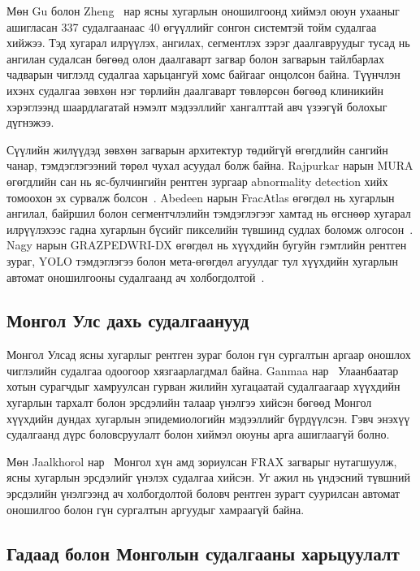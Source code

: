 Мөн Gu болон Zheng~\cite{ref13} нар ясны хугарлын оношилгоонд хиймэл оюун ухааныг ашигласан 337 судалгаанаас 40 өгүүллийг сонгон системтэй тойм судалгаа хийжээ. Тэд хугарал илрүүлэх, ангилах, сегментлэх зэрэг даалгавруудыг тусад нь ангилан судалсан бөгөөд олон даалгаварт загвар болон загварын тайлбарлах чадварын чиглэлд судалгаа харьцангуй хомс байгааг онцолсон байна. Түүнчлэн ихэнх судалгаа зөвхөн нэг төрлийн даалгаварт төвлөрсөн бөгөөд клиникийн хэрэглээнд шаардлагатай нэмэлт мэдээллийг хангалттай авч үзээгүй болохыг дүгнэжээ.

Сүүлийн жилүүдэд зөвхөн загварын архитектур төдийгүй өгөгдлийн сангийн чанар, тэмдэглэгээний төрөл чухал асуудал болж байна. Rajpurkar нарын MURA өгөгдлийн сан нь яс-булчингийн рентген зургаар abnormality detection хийх томоохон эх сурвалж болсон~\cite{ref39}. Abedeen нарын FracAtlas өгөгдөл нь хугарлын ангилал, байршил болон сегментчлэлийн тэмдэглэгээг хамтад нь өгснөөр хугарал илрүүлэхээс гадна хугарлын бүсийг пикселийн түвшинд судлах боломж олгосон~\cite{ref40}. Nagy нарын GRAZPEDWRI-DX өгөгдөл нь хүүхдийн бугуйн гэмтлийн рентген зураг, YOLO тэмдэглэгээ болон мета-өгөгдөл агуулдаг тул хүүхдийн хугарлын автомат оношилгооны судалгаанд ач холбогдолтой~\cite{ref41}.

\subsection*{Монгол Улс дахь судалгаанууд}

Монгол Улсад ясны хугарлыг рентген зураг болон гүн сургалтын аргаар оношлох чиглэлийн судалгаа одоогоор хязгаарлагдмал байна. Ganmaa нар~\cite{ref20} Улаанбаатар хотын сурагчдыг хамруулсан гурван жилийн хугацаатай судалгаагаар хүүхдийн хугарлын тархалт болон эрсдэлийн талаар үнэлгээ хийсэн бөгөөд Монгол хүүхдийн дундах хугарлын эпидемиологийн мэдээллийг бүрдүүлсэн. Гэвч энэхүү судалгаанд дүрс боловсруулалт болон хиймэл оюуны арга ашиглаагүй болно.

Мөн Jaalkhorol нар~\cite{ref21} Монгол хүн амд зориулсан FRAX загварыг нутагшуулж, ясны хугарлын эрсдэлийг үнэлэх судалгаа хийсэн. Уг ажил нь үндэсний түвшний эрсдэлийн үнэлгээнд ач холбогдолтой боловч рентген зурагт суурилсан автомат оношилгоо болон гүн сургалтын аргуудыг хамраагүй байна.

\subsection*{Гадаад болон Монголын судалгааны харьцуулалт}

